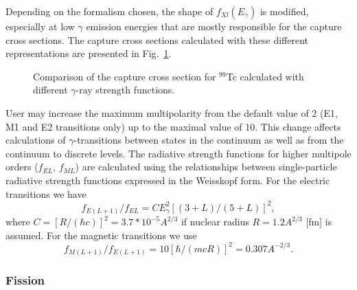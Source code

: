 \documentclass[twocolumn,amsmath,amssymb,10pt,groupedaddress,letter]{revtex4}
\begin{document}
Depending on the formalism chosen, the shape of $f_{Xl}(E_{\gamma})$ is modified, especially at low $\gamma$ emission
 energies that are mostly responsible for the capture cross sections. The capture cross sections calculated
with these different representations are presented in Fig.~\ref{unresolved01}.
\begin{figure}[htbp]
\caption{Comparison of the capture cross section for $^{99}$Tc calculated with
different $\gamma$-ray strength functions.}
\label{unresolved01}
\end{figure}

User may increase the maximum multipolarity from the default value of 2
(E1, M1 and E2 transitions only) up to the maximal value of 10.
This change affects calculations of $\gamma$-transitions between states in the
continuum as well as from the continuum to discrete levels.
The radiative strength functions for higher multipole orders ($f_{EL}$, $f_{ML}$)
are calculated using the relationships between
single-particle radiative strength functions expressed in the Weisskopf form.
For the electric transitions we have
\begin{equation}
f_{E(L+1)}/f_{EL} = C E_{\gamma}^2[(3+L)/(5+L)]^2,
\end{equation}
\noindent where $C=[R/(\hbar c)]^2 = 3.7*10^{-5}A^{2/3}$ if nuclear radius  $R=1.2 A^{2/3}$ [fm] is assumed.
For the magnetic transitions we use
 \begin{equation}
f_{M(L+1)}/f_{E(L+1)} = 10[\hbar/(m c R)]^2 = 0.307 A^{-2/3}.
\end{equation}




\subsubsection{Fission}
\end{document}

